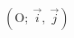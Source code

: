 \documentclass{article}
\begin{document}
$\left(\text{O};~\overrightarrow{i},~\overrightarrow{j}\right)$
\end{document}
